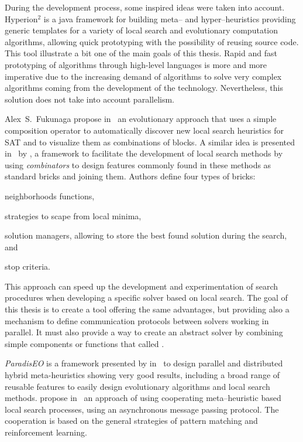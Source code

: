 During the development process, some inspired ideas were taken into account. {\sc Hyperion}$^2$ \cite{Brownlee2014} is a java framework for building meta-- and hyper--heuristics providing generic templates for a variety of local search and evolutionary computation algorithms, allowing quick prototyping with the possibility of reusing source code. This tool illustrate a bit one of the main goals of this thesis. Rapid and fast prototyping of algorithms through high-level languages is more and more imperative due to the increasing demand of algorithms to solve very complex algorithms coming from the development of the technology. Nevertheless, this solution does not take into account parallelism.

Alex~S.~Fukunaga propose in~\cite{Fukunaga2008} an evolutionary approach that uses a simple composition operator to automatically discover new local search heuristics for SAT and to visualize them as combinations of blocks. A similar idea is presented in~\cite{Landtsheer2015} by , a framework to facilitate the development of local search methods by using \textit{combinators} to design features commonly found in these methods as standard bricks and joining them. Authors define four types of bricks: \begin{inparaenum}[1-] \item neighborhoods functions, \item strategies to scape from local minima, \item solution managers, allowing to store the best found solution during the search, and \item stop criteria.
\end{inparaenum} This approach can speed up the development and experimentation of search procedures when developing a specific solver based on local search. The goal of this thesis is to create a tool offering the same advantages, but providing also a mechanism to define communication protocols between solvers working in parallel. It must also provide a way to create an abstract solver by combining simple components or functions that called \ms.

{\it ParadisEO} is a framework presented by  in~\cite{Cahon2004} to design parallel and distributed hybrid meta-heuristics showing very good results, including a broad range of reusable features to easily design evolutionary algorithms and local search methods.  propose in~\cite{Martin2016} an approach of using cooperating meta--heuristic based local search processes, using an asynchronous message passing protocol. The cooperation is based on the general strategies of pattern matching and reinforcement learning. 

